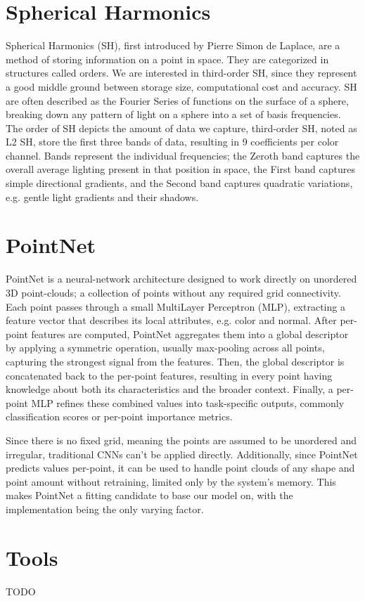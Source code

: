\section{Spherical Harmonics}
Spherical Harmonics (SH), first introduced by Pierre Simon de Laplace, are a method of storing information on a point in space. They are categorized in structures called orders. We are interested in third-order SH, since they represent a good middle ground between storage size, computational cost and accuracy. SH are often described as the Fourier Series of functions on the surface of a sphere, breaking down any pattern of light on a sphere into a set of basis frequencies. The order of SH depicts the amount of data we capture, third-order SH, noted as L2 SH, store the first three bands of data, resulting in 9 coefficients per color channel. Bands represent the individual frequencies; the Zeroth band captures the overall average lighting present in that position in space, the First band captures simple directional gradients, and the Second band captures quadratic variations, e.g. gentle light gradients and their shadows.

\section{PointNet}
PointNet is a neural-network architecture designed to work directly on unordered 3D point-clouds; a collection of points without any required grid connectivity. Each point passes through a small MultiLayer Perceptron (MLP), extracting a feature vector that describes its local attributes, e.g. color and normal. After per-point features are computed, PointNet aggregates them into a global descriptor by applying a symmetric operation, usually max-pooling across all points, capturing the strongest signal from the features. Then, the global descriptor is concatenated back to the per-point features, resulting in every point having knowledge about both its characteristics and the broader context. Finally, a per-point MLP refines these combined values into task-specific outputs, commonly classification scores or per-point importance metrics.

Since there is no fixed grid, meaning the points are assumed to be unordered and irregular, traditional CNNs can't be applied directly. Additionally, since PointNet predicts values per-point, it can be used to handle point clouds of any shape and point amount without retraining, limited only by the system's memory. This makes PointNet a fitting candidate to base our model on, with the implementation being the only varying factor.

\section{Tools}
TODO %
